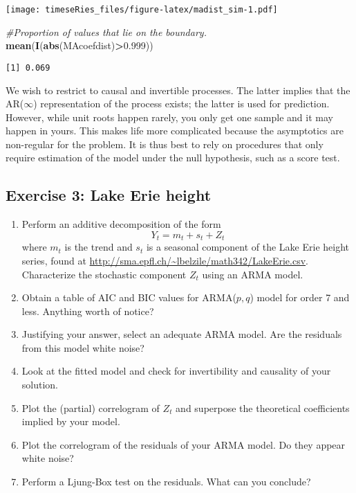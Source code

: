 \documentclass[]{book}
\newenvironment{Shaded}{\begin{snugshade}}{\end{snugshade}}
\newcommand{\KeywordTok}[1]{\textcolor[rgb]{0.13,0.29,0.53}{\textbf{#1}}}
\newcommand{\FloatTok}[1]{\textcolor[rgb]{0.00,0.00,0.81}{#1}}
\newcommand{\CommentTok}[1]{\textcolor[rgb]{0.56,0.35,0.01}{\textit{#1}}}
\newcommand{\OperatorTok}[1]{\textcolor[rgb]{0.81,0.36,0.00}{\textbf{#1}}}
\newcommand{\NormalTok}[1]{#1}
\providecommand{\tightlist}{%
  \setlength{\itemsep}{0pt}\setlength{\parskip}{0pt}}
\begin{document}
\texttt{[image: timeseRies\_files/figure-latex/madist\_sim-1.pdf]}

\begin{Shaded}
\begin{Highlighting}[]
\CommentTok{#Proportion of values that lie on the boundary.}
\KeywordTok{mean}\NormalTok{(}\KeywordTok{I}\NormalTok{(}\KeywordTok{abs}\NormalTok{(MAcoefdist)}\OperatorTok{>}\FloatTok{0.999}\NormalTok{))}
\end{Highlighting}
\end{Shaded}

\begin{verbatim}
[1] 0.069
\end{verbatim}

We wish to restrict to causal and invertible processes. The latter
implies that the AR(\(\infty\)) representation of the process exists;
the latter is used for prediction. However, while unit roots happen
rarely, you only get one sample and it may happen in yours. This makes
life more complicated because the asymptotics are non-regular for the
problem. It is thus best to rely on procedures that only require
estimation of the model under the null hypothesis, such as a score test.

\subsection{Exercise 3: Lake Erie
height}\label{exercise-3-lake-erie-height}

\begin{enumerate}
\def\labelenumi{\arabic{enumi}.}
\tightlist
\item
  Perform an additive decomposition of the form
  \[Y_t = m_t + s_t + Z_t\] where \(m_t\) is the trend and \(s_t\) is a
  seasonal component of the Lake Erie height series, found at
  \href{\%5Bhttp://sma.epfl.ch/~lbelzile/math342/LakeErie.csv\%5D}{http://sma.epfl.ch/\textasciitilde{}lbelzile/math342/LakeErie.csv}.
  Characterize the stochastic component \(Z_t\) using an ARMA model.
\item
  Obtain a table of AIC and BIC values for ARMA(\(p, q\)) model for
  order 7 and less. Anything worth of notice?
\item
  Justifying your answer, select an adequate ARMA model. Are the
  residuals from this model white noise?
\item
  Look at the fitted model and check for invertibility and causality of
  your solution.
\item
  Plot the (partial) correlogram of \(Z_t\) and superpose the
  theoretical coefficients implied by your model.
\item
  Plot the correlogram of the residuals of your ARMA model. Do they
  appear white noise?
\item
  Perform a Ljung-Box test on the residuals. What can you conclude?
\end{enumerate}
\end{document}
